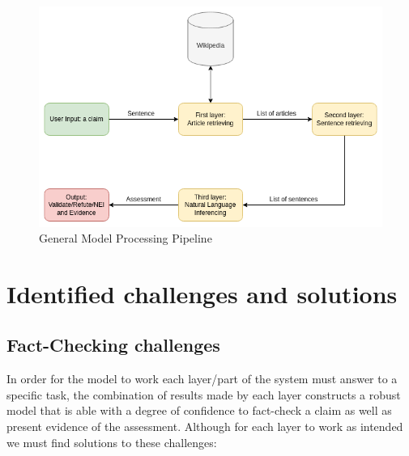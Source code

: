 \documentclass[10pt, english]{report}
\begin{document}
\begin{figure}[H]
	\centering
	\includegraphics[scale=0.6]{img/use_case.png}
	\caption{General Model Processing Pipeline}
\end{figure}


\chapter{Identified challenges and solutions}
\section{Fact-Checking challenges}
In order for the model to work each layer/part of the system must answer to a specific task, the combination of results made by each layer constructs a robust model that is able with a degree of confidence to fact-check a claim as well as present evidence of the assessment. Although for each layer to work as intended we must find solutions to these challenges:\\
\end{document}
